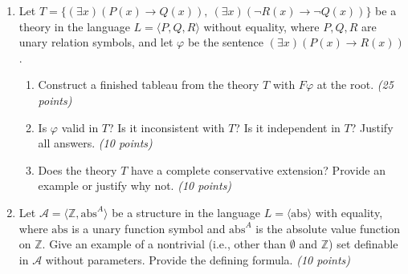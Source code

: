 \documentclass[a4paper]{article}
\begin{document}
\begin{enumerate}
\smallskip

\item Let $T=\{(\exists x)(P(x)\to Q(x)),\ (\exists x)(\neg R(x)\to \neg Q(x))\}$ be a theory in the language $L=\langle P,Q,R\rangle$ without equality, where $P,Q,R$ are unary relation symbols, and let $\varphi$ be the sentence $(\exists x)(P(x) \to R(x))$.
\begin{enumerate}
    \item Construct a finished tableau from the theory $T$ with $F\varphi$ at the root. {\it (25 points)}
    \item Is $\varphi$ valid in $T$? Is it inconsistent with $T$? Is it independent in $T$? Justify all answers. {\it (10 points)}
    \item Does the theory $T$ have a complete conservative extension? Provide an example or justify why not. {\it (10 points)}
\end{enumerate}

\smallskip

\item Let $\mathcal{A}=\langle\mathbb{Z},\mathrm{abs}^A \rangle$ be a structure in the language $L=\langle \mathrm{abs} \rangle$ with equality, where $\mathrm{abs}$ is a unary function symbol and $\mathrm{abs}^A$ is the absolute value function on $\mathbb{Z}$. Give an example of a nontrivial (i.e., other than $\emptyset$ and $\mathbb{Z}$) set definable in $\mathcal{A}$ without parameters. Provide the defining formula. {\it (10 points)}
\end{enumerate}
\end{document}
